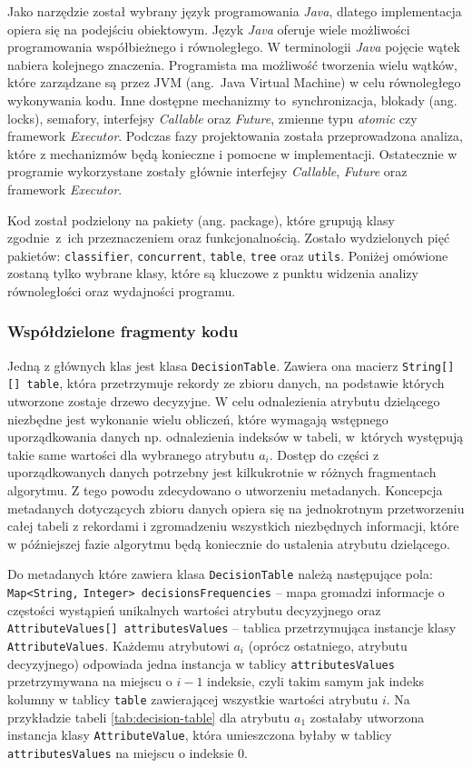 \documentclass[12pt]{article}
\begin{document}
Jako narzędzie został wybrany język programowania \textit{Java}, dlatego implementacja opiera się na podejściu
obiektowym. Język \textit{Java} oferuje wiele możliwości programowania współbieżnego i równoległego. W terminologii \textit{Java}
pojęcie wątek nabiera kolejnego znaczenia. Programista ma możliwość tworzenia wielu wątków, które zarządzane są
przez JVM (ang.~Java Virtual Machine) w celu równoległego wykonywania kodu. Inne dostępne mechanizmy to~synchronizacja,
blokady (ang. locks), semafory, interfejsy \textit{Callable} oraz \textit{Future}, zmienne typu \textit{atomic} czy framework \textit{Executor}.
Podczas fazy projektowania została przeprowadzona analiza, które z mechanizmów będą konieczne i pomocne
w implementacji. Ostatecznie w programie wykorzystane zostały głównie interfejsy \textit{Callable}, \textit{Future} oraz framework \textit{Executor}.

Kod został podzielony na pakiety (ang. package), które grupują klasy zgodnie~z~ich przeznaczeniem oraz funkcjonalnością. Zostało wydzielonych pięć pakietów:
\verb|classifier|, \verb|concurrent|, \verb|table|, \verb|tree| oraz \verb|utils|. Poniżej omówione zostaną tylko wybrane klasy, które są kluczowe z
punktu widzenia analizy równoległości oraz wydajności programu.

\subsubsection{Współdzielone fragmenty kodu}\label{common-code-blocks}

Jedną z głównych klas jest klasa \verb|DecisionTable|. Zawiera ona macierz \verb|String[][] table|, która przetrzymuje rekordy ze zbioru danych,
na podstawie których utworzone zostaje drzewo decyzyjne. W celu odnalezienia atrybutu dzielącego niezbędne jest wykonanie wielu obliczeń, które wymagają 
wstępnego uporządkowania danych np. odnalezienia indeksów w tabeli, w~których występują takie same wartości dla wybranego atrybutu $a_i$. 
Dostęp do części z uporządkowanych danych potrzebny jest kilkukrotnie w różnych fragmentach algorytmu. Z tego powodu zdecydowano o utworzeniu metadanych.
Koncepcja metadanych dotyczących zbioru danych opiera się na jednokrotnym przetworzeniu całej tabeli z rekordami i zgromadzeniu wszystkich niezbędnych
informacji, które w późniejszej fazie algorytmu będą koniecznie do ustalenia atrybutu dzielącego.

Do metadanych które zawiera klasa \verb|DecisionTable| należą następujące pola: \verb|Map<String,| \verb|Integer> decisionsFrequencies| -- mapa gromadzi informacje o częstości wystąpień
unikalnych wartości atrybutu decyzyjnego oraz \verb|AttributeValues[] attributesValues| -- tablica przetrzymująca instancje klasy \verb|AttributeValues|. Każdemu
atrybutowi $a_i$ (oprócz ostatniego, atrybutu decyzyjnego) odpowiada jedna instancja w tablicy \verb|attributesValues| przetrzymywana na miejscu o $i-1$ indeksie, czyli
takim samym jak indeks kolumny w tablicy \verb|table| zawierającej wszystkie wartości atrybutu $i$. Na przykładzie tabeli \ref{tab:decision-table} dla atrybutu $a_1$ zostałaby utworzona instancja klasy \verb|AttributeValue|, która umieszczona byłaby w tablicy
\verb|attributesValues| na miejscu o indeksie $0$.
\end{document}
